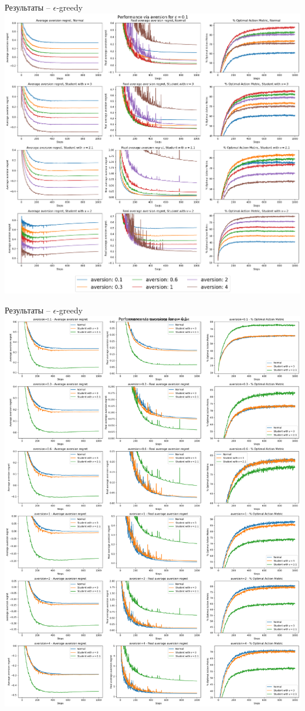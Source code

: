 \documentclass[11pt]{beamer} %
\begin{document}
    \begin{frame}{Результаты -- $\epsilon$-greedy}
        \includegraphics[scale=0.13,center]{images/theory_images/epsilon_greedy/avers_distr.png}
    \end{frame}
    \begin{frame}{Результаты -- $\epsilon$-greedy}
        \includegraphics[scale=0.13,center]{images/theory_images/epsilon_greedy/avers_avers.png}
    \end{frame}
\end{document}
